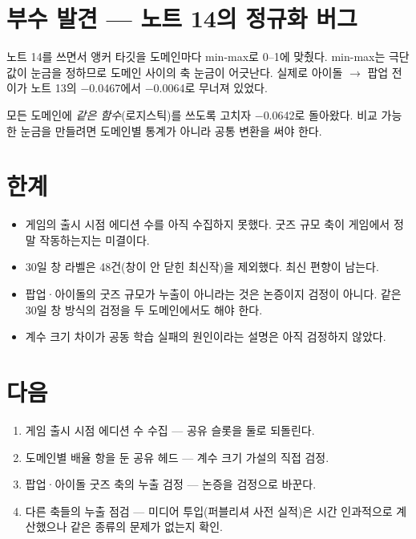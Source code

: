 \documentclass[10pt]{article}
\begin{document}
\section{부수 발견 --- 노트 14의 정규화 버그}

노트 14를 쓰면서 앵커 타깃을 도메인마다 min-max로 0--1에 맞췄다. min-max는
극단값이 눈금을 정하므로 도메인 사이의 축 눈금이 어긋난다. 실제로 아이돌 $\to$
팝업 전이가 노트 13의 $-$0.0467에서 $-$0.0064로 무너져 있었다.

모든 도메인에 \emph{같은 함수}(로지스틱)를 쓰도록 고치자 $-$0.0642로 돌아왔다.
비교 가능한 눈금을 만들려면 도메인별 통계가 아니라 공통 변환을 써야 한다.

\section{한계}

\begin{itemize}[leftmargin=1.1em,itemsep=0.15em]
\item 게임의 출시 시점 에디션 수를 아직 수집하지 못했다. 굿즈 규모 축이 게임에서
      정말 작동하는지는 미결이다.
\item 30일 창 라벨은 48건(창이 안 닫힌 최신작)을 제외했다. 최신 편향이 남는다.
\item 팝업·아이돌의 굿즈 규모가 누출이 아니라는 것은 논증이지 검정이 아니다.
      같은 30일 창 방식의 검정을 두 도메인에서도 해야 한다.
\item 계수 크기 차이가 공동 학습 실패의 원인이라는 설명은 아직 검정하지 않았다.
\end{itemize}

\section{다음}

\begin{enumerate}[leftmargin=1.3em,itemsep=0.15em]
\item 게임 출시 시점 에디션 수 수집 --- 공유 슬롯을 둘로 되돌린다.
\item 도메인별 배율 항을 둔 공유 헤드 --- 계수 크기 가설의 직접 검정.
\item 팝업·아이돌 굿즈 축의 누출 검정 --- 논증을 검정으로 바꾼다.
\item 다른 축들의 누출 점검 --- 미디어 투입(퍼블리셔 사전 실적)은 시간 인과적으로
      계산했으나 같은 종류의 문제가 없는지 확인.
\end{enumerate}
\end{document}
